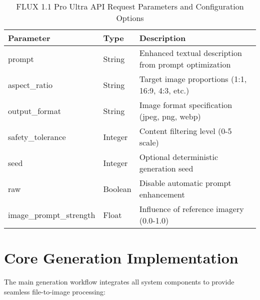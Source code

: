 \begin{table}[H]
\centering
\caption{FLUX 1.1 Pro Ultra API Request Parameters and Configuration Options}
\label{tab:flux_api_parameters}
{\begin{tabular}{lll}
\toprule
\textbf{Parameter} & \textbf{Type} & \textbf{Description} \\
\midrule
prompt & String & Enhanced textual description from prompt optimization \\
aspect\_ratio & String & Target image proportions (1:1, 16:9, 4:3, etc.) \\
output\_format & String & Image format specification (jpeg, png, webp) \\
safety\_tolerance & Integer & Content filtering level (0-5 scale) \\
seed & Integer & Optional deterministic generation seed \\
raw & Boolean & Disable automatic prompt enhancement \\
image\_prompt\_strength & Float & Influence of reference imagery (0.0-1.0) \\
\bottomrule
\end{tabular}}
\end{table}

\section{Core Generation Implementation}


The main generation workflow integrates all system components to provide seamless file-to-image processing:

